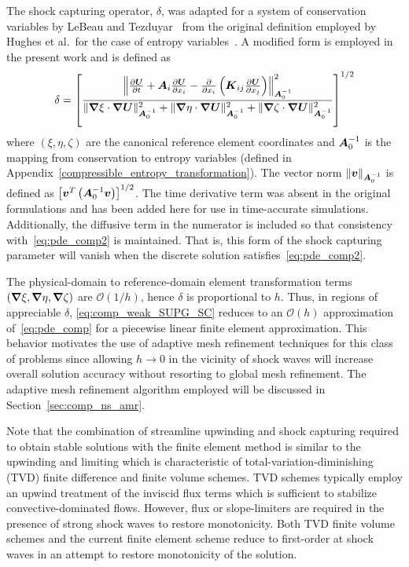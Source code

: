 The shock capturing operator, $\delta$, was adapted for a system of conservation variables by LeBeau and Tezduyar~\cite{gjlebeau_thesis,skaliabadi_dissertation,aliabadi_tezduyar_IJNMF_1995} from the original definition employed by Hughes et al.\ for the case of entropy variables~\cite{hughes_shock_capturing,shakib_hughes_ns}.  A modified form is employed in the present work and is defined as
\begin{equation}
  \label{eq:shock_capturing_parameter}
  \delta = \left[\frac{\left\|{\frac{\partial{{\boldsymbol{U}}}}{\partial{t}}} + {\boldsymbol{A}}_i{\frac{\partial{{\boldsymbol{U}}}}{\partial{x_i}}}
                       - {\frac{\partial{}}{\partial{x_i}}} \left( {\boldsymbol{K}}_{ij} {\frac{\partial{{\boldsymbol{U}}}}{\partial{x_j}}} \right)\right\|^2_{{\boldsymbol{A}}_0^{-1}}}
                      {\|{\boldsymbol{\nabla}} {\xi}  \cdot{\boldsymbol{\nabla}} {{\boldsymbol{U}}}\|^2_{{\boldsymbol{A}}_0^{-1}} +
		       \|{\boldsymbol{\nabla}} {\eta} \cdot{\boldsymbol{\nabla}} {{\boldsymbol{U}}}\|^2_{{\boldsymbol{A}}_0^{-1}} +
		       \|{\boldsymbol{\nabla}} {\zeta}\cdot{\boldsymbol{\nabla}} {{\boldsymbol{U}}}\|^2_{{\boldsymbol{A}}_0^{-1}}}\right]^{1/2}
\end{equation}
where $\left(\xi,\eta,\zeta\right)$ are the canonical reference element coordinates and ${\boldsymbol{A}}_0^{-1}$ is the mapping from conservation to entropy variables (defined in Appendix~\ref{compressible_entropy_transformation}). The vector norm $\|{\boldsymbol{v}}\|_{{\boldsymbol{A}}_0^{-1}}$ is defined as $\left[{\boldsymbol{v}}^T \left({\boldsymbol{A}}_0^{-1}{\boldsymbol{v}}\right)\right]^{1/2}$. The time derivative term was absent in the original formulations and has been added here for use in time-accurate simulations.  Additionally, the diffusive term in the numerator is included so that consistency with~\eqref{eq:pde_comp2} is maintained.  That is, this form of the shock capturing parameter will vanish when the discrete solution satisfies~\eqref{eq:pde_comp2}.

The physical-domain to reference-domain element transformation terms \\$\left({\boldsymbol{\nabla}} {\xi},{\boldsymbol{\nabla}} {\eta},{\boldsymbol{\nabla}} {\zeta}\right)$ are $\mathcal{O}(1/h)$, hence $\delta$ is proportional to $h$.  Thus, in regions of appreciable $\delta$, \eqref{eq:comp_weak_SUPG_SC} reduces to an $\mathcal{O}(h)$ approximation of~\eqref{eq:pde_comp} for a piecewise linear finite element approximation.  This behavior motivates the use of adaptive mesh refinement techniques for this class of problems since allowing $h\rightarrow 0$ in the vicinity of shock waves will increase overall solution accuracy without resorting to global mesh refinement.  The adaptive mesh refinement algorithm employed will be discussed in Section~\ref{sec:comp_ns_amr}.

Note that the combination of streamline upwinding and shock capturing required to obtain stable solutions with the finite element method is similar to the upwinding and limiting which is characteristic of total-variation-diminishing (TVD) finite difference and finite volume schemes.  TVD schemes typically employ an upwind treatment of the inviscid flux terms which is sufficient to stabilize convective-dominated flows.  However, flux or slope-limiters are required in the presence of strong shock waves to restore monotonicity.  Both TVD finite volume schemes and the current finite element scheme reduce to first-order at shock waves in an attempt to restore monotonicity of the solution.

